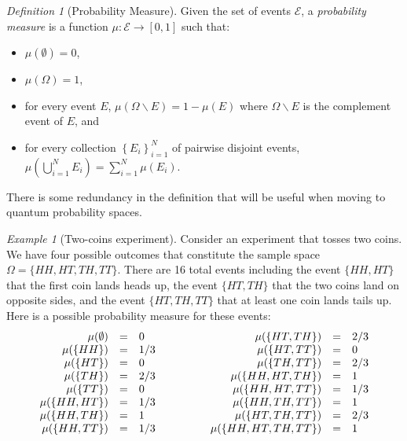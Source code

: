 \documentclass{article}
\theoremstyle{remark}
\newtheorem{example}{Example}
\newtheorem{definition}{Definition}
\newcommand{\events}{\ensuremath{\mathcal{E}}}
\newcommand{\pmeas}{\ensuremath{\mu}}
\begin{document}
\begin{definition}[Probability Measure]\label{def:ClassicalProbabilitySpace}
  Given the set of events $\events$, a \emph{probability measure} is a
  function $\pmeas:\events\rightarrow[0,1]$ such that:
\begin{itemize}
\item $\pmeas(\emptyset)=0$,
\item $\pmeas(\Omega)=1$, 
\item for every event $E$,
  $\pmeas\left(\Omega\backslash E\right)=1-\pmeas\left(E\right)$ where
  $\Omega\backslash E$ is the complement event of $E$, and
\item for every collection $\left\{ E_{i}\right\} _{i=1}^{N}$ of
  pairwise disjoint events,
  $\pmeas\left(\bigcup_{i=1}^{N}E_{i}\right)=\sum_{i=1}^{N}\pmeas(E_{i})$.
\end{itemize}
\end{definition}
\noindent There is some redundancy in the definition that will be useful when
moving to quantum probability spaces. 

\begin{example}[Two-coins experiment]\label{ex1} Consider an
  experiment that tosses two coins. We have four possible outcomes
  that constitute the sample space $\Omega=\{HH,HT,TH,TT\}$. There are
  16 total events including the event $\{HH,HT\}$ that the first coin
  lands heads up, the event $\{HT,TH\}$ that the two coins land on
  opposite sides, and the event $\{HT,TH,TT\}$ that at least one coin
  lands tails up. Here is a possible probability measure for these
  events:
\[
\begin{array}{c@{\qquad\qquad}c}
\begin{array}{rcl}
\pmeas(\emptyset) & = & 0\\
\pmeas(\{HH\}) & = & 1/3\\
\pmeas(\{HT\}) & = & 0\\
\pmeas(\{TH\}) & = & 2/3\\
\pmeas(\{TT\}) & = & 0\\
\pmeas(\{HH,HT\}) & = & 1/3\\
\pmeas(\{HH,TH\}) & = & 1\\
\pmeas(\{HH,TT\}) & = & 1/3
\end{array} & \begin{array}{rcl}
\pmeas(\{HT,TH\}) & = & 2/3\\
\pmeas(\{HT,TT\}) & = & 0\\
\pmeas(\{TH,TT\}) & = & 2/3\\
\pmeas(\{HH,HT,TH\}) & = & 1\\
\pmeas(\{HH,HT,TT\}) & = & 1/3\\
\pmeas(\{HH,TH,TT\}) & = & 1\\
\pmeas(\{HT,TH,TT\}) & = & 2/3\\
\pmeas(\{HH,HT,TH,TT\}) & = & 1
\end{array}\end{array}
\]
\end{example}
\end{document}
